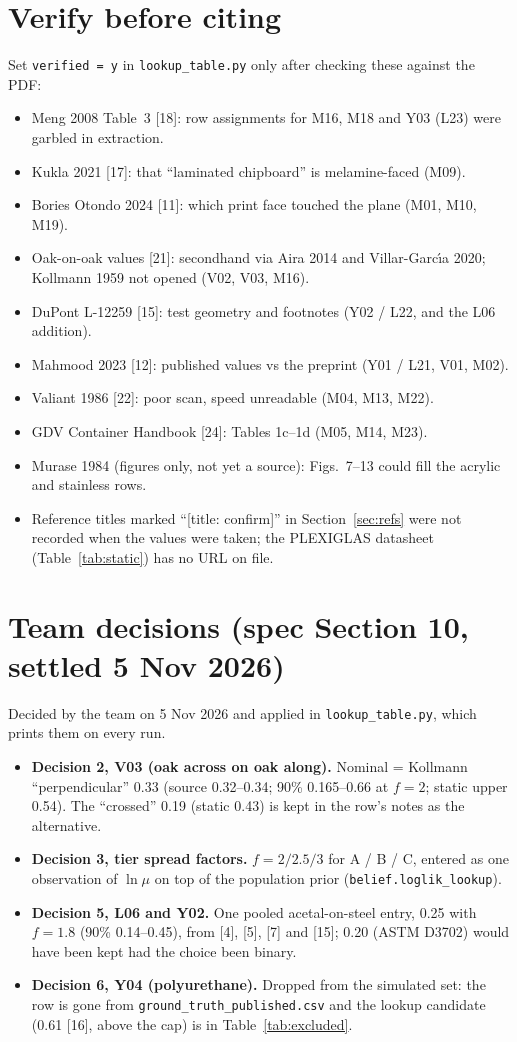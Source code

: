 \documentclass[11pt]{article}
\begin{document}
\section{Verify before citing}\label{sec:verify}
Set \texttt{verified = y} in \texttt{lookup\_table.py} only after checking these against the PDF:
\begin{itemize}
 \item Meng 2008 Table~3 [18]: row assignments for M16, M18 and Y03 (L23) were garbled in extraction.
 \item Kukla 2021 [17]: that ``laminated chipboard'' is melamine-faced (M09).
 \item Bories Otondo 2024 [11]: which print face touched the plane (M01, M10, M19).
 \item Oak-on-oak values [21]: secondhand via Aira 2014 and Villar-Garc\'{\i}a 2020; Kollmann 1959 not opened (V02, V03, M16).
 \item DuPont L-12259 [15]: test geometry and footnotes (Y02 / L22, and the L06 addition).
 \item Mahmood 2023 [12]: published values vs the preprint (Y01 / L21, V01, M02).
 \item Valiant 1986 [22]: poor scan, speed unreadable (M04, M13, M22).
 \item GDV Container Handbook [24]: Tables 1c--1d (M05, M14, M23).
 \item Murase 1984 (figures only, not yet a source): Figs.~7--13 could fill the acrylic and stainless rows.
 \item Reference titles marked ``[title: confirm]'' in Section~\ref{sec:refs} were not recorded when the values were taken; the PLEXIGLAS datasheet (Table~\ref{tab:static}) has no URL on file.
\end{itemize}

\section{Team decisions (spec Section 10, settled 5 Nov 2026)}\label{sec:placeholders}
Decided by the team on 5 Nov 2026 and applied in \texttt{lookup\_table.py}, which prints them on every run.
\begin{itemize}
 \item \textbf{Decision 2, V03 (oak across on oak along).} Nominal = Kollmann ``perpendicular'' 0.33 (source 0.32--0.34; 90\% 0.165--0.66 at $f = 2$; static upper 0.54). The ``crossed'' 0.19 (static 0.43) is kept in the row's notes as the alternative.
 \item \textbf{Decision 3, tier spread factors.} $f = 2 / 2.5 / 3$ for A / B / C, entered as one observation of $\ln\mu$ on top of the population prior (\texttt{belief.loglik\_lookup}).
 \item \textbf{Decision 5, L06 and Y02.} One pooled acetal-on-steel entry, 0.25 with $f = 1.8$ (90\% 0.14--0.45), from [4], [5], [7] and [15]; 0.20 (ASTM D3702) would have been kept had the choice been binary.
 \item \textbf{Decision 6, Y04 (polyurethane).} Dropped from the simulated set: the row is gone from \texttt{ground\_truth\_published.csv} and the lookup candidate (0.61 [16], above the cap) is in Table~\ref{tab:excluded}.
\end{itemize}
\end{document}
